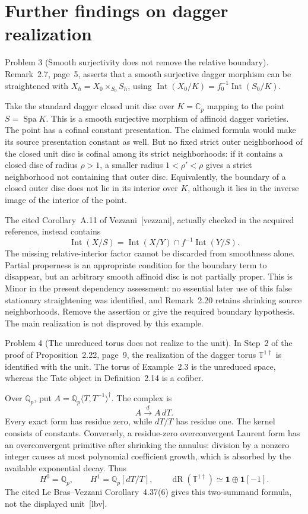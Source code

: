 \documentclass[10pt]{article}
\begin{document}
\section*{Further findings on dagger realization}
Problem 3 (Smooth surjectivity does not remove the relative boundary).  Remark 2.7, page 5, asserts that a smooth surjective dagger morphism can be straightened with \(X_h=X_0\times_{S_0}S_h\), using \(\operatorname{Int}(X_0/K)=f_0^{-1}\operatorname{Int}(S_0/K)\).\par
Take the standard dagger closed unit disc over \(K=\mathbb C_p\) mapping to the point \(S=\operatorname{Spa}K\). This is a smooth surjective morphism of affinoid dagger varieties. The point has a cofinal constant presentation. The claimed formula would make its source presentation constant as well. But no fixed strict outer neighborhood of the closed unit disc is cofinal among its strict neighborhoods: if it contains a closed disc of radius \(\rho>1\), a smaller radius \(1<\rho'<\rho\) gives a strict neighborhood not containing that outer disc. Equivalently, the boundary of a closed outer disc does not lie in its interior over \(K\), although it lies in the inverse image of the interior of the point.\par
The cited Corollary A.11 of Vezzani [vezzani], actually checked in the acquired reference, instead contains \[\operatorname{Int}(X/S)=\operatorname{Int}(X/Y)\cap f^{-1}\operatorname{Int}(Y/S).\] The missing relative-interior factor cannot be discarded from smoothness alone. Partial properness is an appropriate condition for the boundary term to disappear, but an arbitrary smooth affinoid disc is not partially proper. This is Minor in the present dependency assessment: no essential later use of this false stationary straightening was identified, and Remark 2.20 retains shrinking source neighborhoods. Remove the assertion or give the required boundary hypothesis. The main realization is not disproved by this example.\par
Problem 4 (The unreduced torus does not realize to the unit).  In Step 2 of the proof of Proposition 2.22, page 9, the realization of the dagger torus \(\mathbb T^{1\dagger}\) is identified with the unit. The torus of Example 2.3 is the unreduced space, whereas the Tate object in Definition 2.14 is a cofiber.\par
Over \(\mathbb Q_p\), put \(A=\mathbb Q_p\langle T,T^{-1}\rangle^\dagger\). The complex is \[A\xrightarrow{\,d\,}A\,dT.\] Every exact form has residue zero, while \(dT/T\) has residue one. The kernel consists of constants. Conversely, a residue-zero overconvergent Laurent form has an overconvergent primitive after shrinking the annulus: division by a nonzero integer causes at most polynomial coefficient growth, which is absorbed by the available exponential decay. Thus \[H^0=\mathbb Q_p,\qquad H^1=\mathbb Q_p[dT/T],
 \qquad \operatorname{dR}(\mathbb T^{1\dagger})\simeq\mathbf1\oplus\mathbf1[-1].\] The cited Le Bras–Vezzani Corollary 4.37(6) gives this two-summand formula, not the displayed unit [lbv].\par
\end{document}
